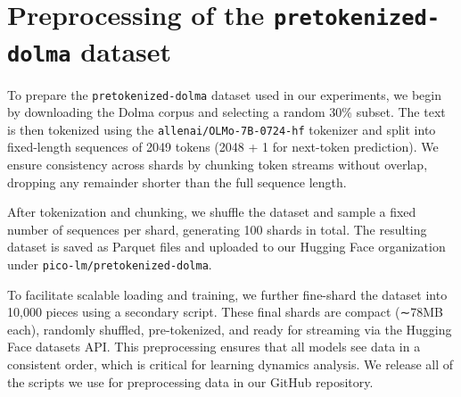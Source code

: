 \section{Preprocessing of the \texttt{pretokenized-dolma} dataset}
\label{app:pretokenized-dolma}
To prepare the \texttt{pretokenized-dolma} dataset used in our experiments, we begin by downloading the Dolma corpus and selecting a random 30\% subset. The text is then tokenized using the \verb|allenai/OLMo-7B-0724-hf| tokenizer and split into fixed-length sequences of 2049 tokens (2048 + 1 for next-token prediction). We ensure consistency across shards by chunking token streams without overlap, dropping any remainder shorter than the full sequence length.

After tokenization and chunking, we shuffle the dataset and sample a fixed number of sequences per shard, generating 100 shards in total. The resulting dataset is saved as Parquet files and uploaded to our Hugging Face organization under \verb|pico-lm/pretokenized-dolma|.

To facilitate scalable loading and training, we further fine-shard the dataset into 10,000 pieces using a secondary script. These final shards are compact (∼78MB each), randomly shuffled, pre-tokenized, and ready for streaming via the Hugging Face datasets API. This preprocessing ensures that all models see data in a consistent order, which is critical for learning dynamics analysis. We release all of the scripts we use for preprocessing data in our GitHub repository.